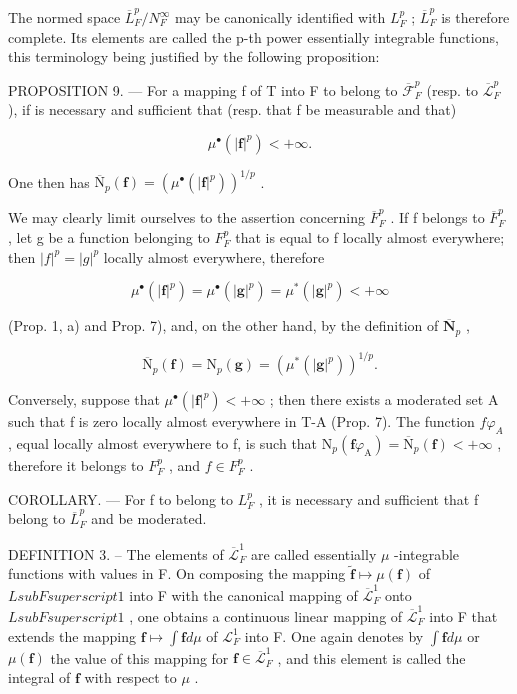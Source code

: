 The normed space \(\overline{L}_{F}^{p}/N_{F}^{\infty}\) may be canonically identified with \(L_{F}^{p}\) ; \(\overline{L}_{F}^{p}\) is therefore complete. Its elements are called the p-th power essentially integrable functions, this terminology being justified by the following proposition:

PROPOSITION 9. --- For a mapping f of T into F to belong to \(\overline{\mathcal{F}}_F^p\) (resp. to \(\overline{\mathcal{L}}_F^p\) ), if is necessary and sufficient that (resp. that f be measurable and that)

\[
\mu^ {\bullet} (| \mathbf {f} | ^ {p}) <   + \infty .
\]

One then has \(\overline{\mathrm{N}}_p(\mathbf{f}) = (\mu^\bullet (|\mathbf{f}|^p))^{1 / p}\) .

We may clearly limit ourselves to the assertion concerning \(\overline{F}_{F}^{p}\) . If f belongs to \(\overline{F}_{F}^{p}\) , let g be a function belonging to \(F_{F}^{p}\) that is equal to f locally almost everywhere; then \(|f|^{p}=|g|^{p}\) locally almost everywhere, therefore

\[
\mu^ {\bullet} (| \mathbf {f} | ^ {p}) = \mu^ {\bullet} (| \mathbf {g} | ^ {p}) = \mu^ {*} (| \mathbf {g} | ^ {p}) <   + \infty
\]

(Prop. 1, a) and Prop. 7), and, on the other hand, by the definition of \(\overline{\mathbf{N}}_p\) ,

\[
\overline {{\mathrm{N}}} _ {p} (\mathbf {f}) = \mathrm{N} _ {p} (\mathbf {g}) = \left(\mu^ {*} (| \mathbf {g} | ^ {p})\right) ^ {1 / p}.
\]

Conversely, suppose that \(\mu^{\bullet}(|\mathbf{f}|^{p}) < +\infty\) ; then there exists a moderated set A such that f is zero locally almost everywhere in T-A (Prop. 7). The function \(f\varphi_{A}\) , equal locally almost everywhere to f, is such that \(\mathrm{N}_{p}(\mathbf{f}\varphi_{\mathrm{A}}) = \overline{\mathrm{N}}_{p}(\mathbf{f}) < +\infty\) , therefore it belongs to \(F_{F}^{p}\) , and \(f \in F_{F}^{p}\) .

COROLLARY. --- For f to belong to \(L_{F}^{p}\) , it is necessary and sufficient that f belong to \(\overline{L}_{F}^{p}\) and be moderated.

DEFINITION 3. -- The elements of \(\overline{\mathcal{L}}_F^1\) are called essentially \(\mu\) -integrable functions with values in F. On composing the mapping \(\widetilde{\mathbf{f}} \mapsto \mu(\mathbf{f})\) of \(L sub F superscript 1\) into F with the canonical mapping of \(\overline{\mathcal{L}}_F^1\) onto \(L sub F superscript 1\) , one obtains a continuous linear mapping of \(\overline{\mathcal{L}}_F^1\) into F that extends the mapping \(\mathbf{f} \mapsto \int \mathbf{f} d\mu\) of \(\mathcal{L}_F^1\) into F. One again denotes by \(\int \mathbf{f} d\mu\) or \(\mu(\mathbf{f})\) the value of this mapping for \(\mathbf{f} \in \overline{\mathcal{L}}_F^1\) , and this element is called the integral of \(\mathbf{f}\) with respect to \(\mu\) .

